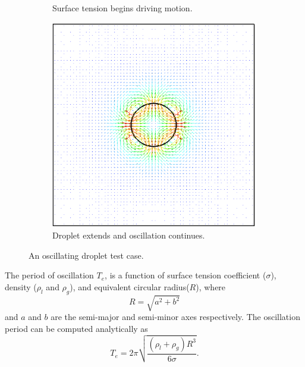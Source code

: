 \begin{figure}[htbp]
\begin{subfigure}{0.3\textwidth}
		\caption{Surface tension begins driving motion.}
		\label{fig:Odrop2}
	\end{subfigure}
\hfill
\begin{subfigure}{0.3\textwidth}
	\centering
	\includegraphics[width=1.0\linewidth]{figs/Odrop3}
	\caption{Droplet extends and oscillation continues.}
	\label{fig:Odrop3}
\end{subfigure}
\caption{An oscillating droplet test case.}
\end{figure}
The period of oscillation $T_{e}$, is a function of surface tension coefficient ($\sigma$), density ($\rho_l$ and $\rho_g$), and equivalent circular radius($R$), where 
\begin{equation}
R = \sqrt{a^2+b^2}
\end{equation}and $a$ and $b$ are the semi-major and semi-minor axes respectively. The oscillation period can be computed analytically as~\cite{Rayleigh}
\begin{equation}
T_{e} = 2 \pi \sqrt{\frac{(\rho_{l}+\rho_{g})R^3}{6\sigma}}.
\label{period}
\end{equation}

